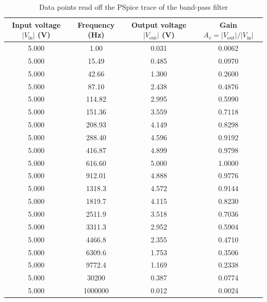 \documentclass[12pt,a4paper]{article}
\begin{document}
	\begin{table}[H]
		\centering
		\caption{Data points read off the PSpice trace of the band-pass filter}
		\label{tab:data3}
		\small
		\renewcommand{\arraystretch}{1.2}
		\begin{tabular}{|c|c|c|c|}
			\hline
			\rowcolor{black!12}\textbf{Input voltage $|V_{\mathrm{in}}|$ (V)} & \textbf{Frequency (Hz)} & \textbf{Output voltage $|V_{\mathrm{out}}|$ (V)} & \textbf{Gain $A_v = |V_{\mathrm{out}}|/|V_{\mathrm{in}}|$} \\
			\hline
			\num{5.000} & \num{1.00} & \num{0.031} & \num{0.0062}\\
			\hline
			\num{5.000} & \num{15.49} & \num{0.485} & \num{0.0970}\\
			\hline
			\num{5.000} & \num{42.66} & \num{1.300} & \num{0.2600}\\
			\hline
			\num{5.000} & \num{87.10} & \num{2.438} & \num{0.4876}\\
			\hline
			\num{5.000} & \num{114.82} & \num{2.995} & \num{0.5990}\\
			\hline
			\num{5.000} & \num{151.36} & \num{3.559} & \num{0.7118}\\
			\hline
			\num{5.000} & \num{208.93} & \num{4.149} & \num{0.8298}\\
			\hline
			\num{5.000} & \num{288.40} & \num{4.596} & \num{0.9192}\\
			\hline
			\num{5.000} & \num{416.87} & \num{4.899} & \num{0.9798}\\
			\hline
			\num{5.000} & \num{616.60} & \num{5.000} & \num{1.0000}\\
			\hline
			\num{5.000} & \num{912.01} & \num{4.888} & \num{0.9776}\\
			\hline
			\num{5.000} & \num{1318.3} & \num{4.572} & \num{0.9144}\\
			\hline
			\num{5.000} & \num{1819.7} & \num{4.115} & \num{0.8230}\\
			\hline
			\num{5.000} & \num{2511.9} & \num{3.518} & \num{0.7036}\\
			\hline
			\num{5.000} & \num{3311.3} & \num{2.952} & \num{0.5904}\\
			\hline
			\num{5.000} & \num{4466.8} & \num{2.355} & \num{0.4710}\\
			\hline
			\num{5.000} & \num{6309.6} & \num{1.753} & \num{0.3506}\\
			\hline
			\num{5.000} & \num{9772.4} & \num{1.169} & \num{0.2338}\\
			\hline
			\num{5.000} & \num{30200} & \num{0.387} & \num{0.0774}\\
			\hline
			\num{5.000} & \num{1000000} & \num{0.012} & \num{0.0024} \\
			\hline
		\end{tabular}
	\end{table}
\end{document}
